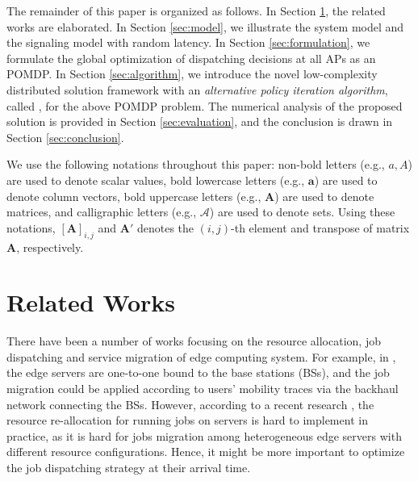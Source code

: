 The remainder of this paper is organized as follows.
In Section \ref{sec:review}, the related works are elaborated.
In Section \ref{sec:model}, we illustrate the system model and the signaling model with random latency.
In Section \ref{sec:formulation}, we formulate the global optimization of dispatching decisions at all APs as an POMDP.
In Section \ref{sec:algorithm}, we introduce the novel low-complexity distributed solution framework with an \emph{alternative policy iteration algorithm}, called \algname, for the above POMDP problem.
The numerical analysis of the proposed solution is provided in Section \ref{sec:evaluation}, and the conclusion is drawn in Section \ref{sec:conclusion}.

We use the following notations throughout this paper: 
non-bold letters (e.g., $a, A$) are used to denote scalar values,
bold lowercase letters (e.g., $\mathbf{a}$) are used to denote column vectors,
bold uppercase letters (e.g., $\mathbf{A}$) are used to denote matrices,
and calligraphic letters (e.g., $\mathcal{A}$) are used to denote sets.
Using these notations, $[\mathbf{A}]_{i,j}$ and $\mathbf{A}'$ denotes the $(i,j)$-th element and transpose of matrix $\mathbf{A}$, respectively.

\section{Related Works}
\label{sec:review}
There have been a number of works focusing on the resource allocation, job dispatching and service migration of edge computing system.
For example, in \cite{TON19-WangSq}, the edge servers are one-to-one bound to the base stations (BSs), and the job migration could be applied according to users' mobility traces via the backhaul network connecting the BSs.
However, according to a recent research \cite{INFOCOM19-WuC}, the resource re-allocation for running jobs on servers is hard to implement in practice, as it is hard for jobs migration among heterogeneous edge servers with different resource configurations.
Hence, it might be more important to optimize the job dispatching strategy at their arrival time.

